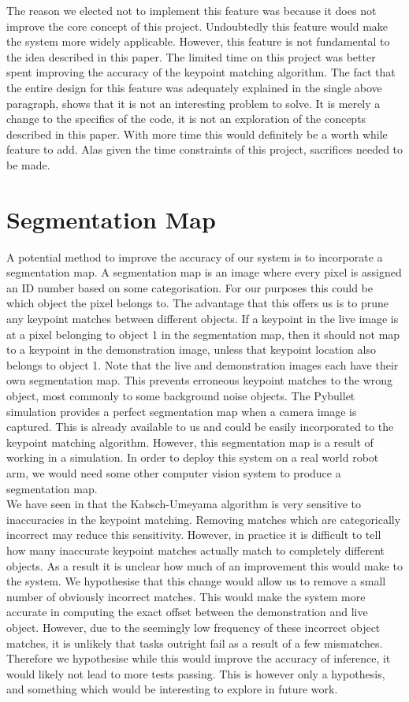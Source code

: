 The reason we elected not to implement this feature was because it does not improve the core concept of this project. Undoubtedly this feature would make the system more widely applicable. However, this feature is not fundamental to the idea described in this paper. The limited time on this project was better spent improving the accuracy of the keypoint matching algorithm. The fact that the entire design for this feature was adequately explained in the single above paragraph, shows that it is not an interesting problem to solve. It is merely a change to the specifics of the code, it is not an exploration of the concepts described in this paper. With more time this would definitely be a worth while feature to add. Alas given the time constraints of this project, sacrifices needed to be made.

\section{Segmentation Map}
A potential method to improve the accuracy of our system is to incorporate a segmentation map. A segmentation map is an image where every pixel is assigned an ID number based on some categorisation. For our purposes this could be which object the pixel belongs to. The advantage that this offers us is to prune any keypoint matches between different objects. If a keypoint in the live image is at a pixel belonging to object 1 in the segmentation map, then it should not map to a keypoint in the demonstration image, unless that keypoint location also belongs to object 1. Note that the live and demonstration images each have their own segmentation map. This prevents erroneous keypoint matches to the wrong object, most commonly to some background noise objects. The Pybullet simulation provides a perfect segmentation map when a camera image is captured. This is already available to us and could be easily incorporated to the keypoint matching algorithm. However, this segmentation map is a result of working in a simulation. In order to deploy this system on a real world robot arm, we would need some other computer vision system to produce a segmentation map.\\

We have seen in  that the Kabsch-Umeyama algorithm is very sensitive to inaccuracies in the keypoint matching. Removing matches which are categorically incorrect may reduce this sensitivity. However, in practice it is difficult to tell how many inaccurate keypoint matches actually match to completely different objects. As a result it is unclear how much of an improvement this would make to the system. We hypothesise that this change would allow us to remove a small number of obviously incorrect matches. This would make the system more accurate in computing the exact offset between the demonstration and live object. However, due to the seemingly low frequency of these incorrect object matches, it is unlikely that tasks outright fail as a result of a few mismatches. Therefore we hypothesise while this would improve the accuracy of inference, it would likely not lead to more tests passing. This is however only a hypothesis, and something which would be interesting to explore in future work.

